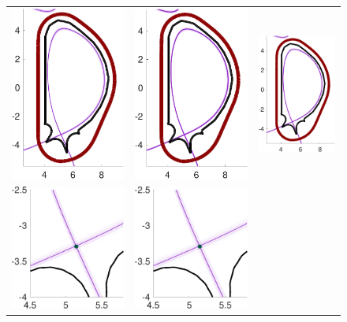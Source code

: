    

   


\begin{figure}[ht!]\centering
\begin{tabular}{ccc}
\includegraphics[width=0.19\linewidth]{./figures/QoI_MC_uniform.pdf}
&\includegraphics[width=0.19\linewidth]{./figures/QoI_MLMC_DirectSolver_Interp2CommonGrid.pdf} 
& \includegraphics[width=0.19\linewidth]{./figures/QoI_MFMC.pdf} 
\\
\includegraphics[width=0.19\linewidth]{./figures/QoI_MC_uniform_xptRegion.pdf} 
&\includegraphics[width=0.19\linewidth]{./figures/QoI_MLMC_DirectSolver_xptRegion_Interp2CommonGrid.pdf} 

\end{tabular}
\end{figure}

